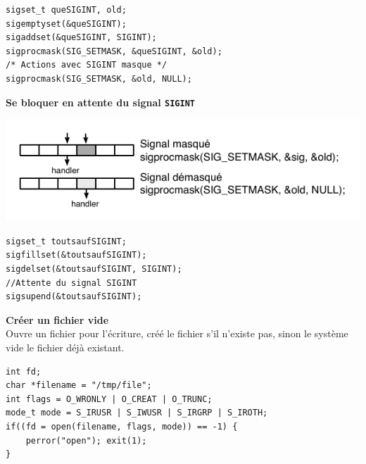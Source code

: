 \documentclass[french]{scrartcl}
\makeatletter
\newenvironment{BlockIndent}{\list{}%
    {\setlength{\leftmargin}{4mm}%
	 \setlength{\listparindent}{\parindent}%
     \setlength{\itemindent}{\listparindent}%
     \setlength{\topsep}{0pt}}%
     \item[]\relax}
{\endlist}
\newenvironment{figurehere}
  {\def\@captype{figure}}
  {}
\makeatother
\begin{document}
\begin{multicols}{3}
\begin{BlockIndent}
\vspace{-5pt}\begin{lstlisting}
sigset_t queSIGINT, old;
sigemptyset(&queSIGINT);
sigaddset(&queSIGINT, SIGINT);
sigprocmask(SIG_SETMASK, &queSIGINT, &old);
/* Actions avec SIGINT masque */
sigprocmask(SIG_SETMASK, &old, NULL);
\end{lstlisting}\vspace{-5pt}
\end{BlockIndent}

\vskip 5pt
\textbf{Se bloquer en attente du signal \lstinline!SIGINT!}

\begin{figurehere}
	\vspace{-5pt}
    \includegraphics[scale=.75]{images/masquer-signal}
	\vspace{-7pt}
\end{figurehere}
\begin{BlockIndent}
\vspace{-5pt}\begin{lstlisting}
sigset_t toutsaufSIGINT;
sigfillset(&toutsaufSIGINT);
sigdelset(&toutsaufSIGINT, SIGINT);
//Attente du signal SIGINT
sigsupend(&toutsaufSIGINT);
\end{lstlisting}\vspace{-5pt}
\end{BlockIndent}

\vskip 5pt
\textbf{Créer un fichier vide}\\
Ouvre un fichier pour l'écriture, créé le fichier s'il n'existe pas, sinon le système vide le fichier déjà existant.
\begin{BlockIndent}
\vspace{-5pt}\begin{lstlisting}
int fd;
char *filename = "/tmp/file";
int flags = O_WRONLY | O_CREAT | O_TRUNC;
mode_t mode = S_IRUSR | S_IWUSR | S_IRGRP | S_IROTH;
if((fd = open(filename, flags, mode)) == -1) {
    perror("open"); exit(1);
}
\end{lstlisting}\vspace{-5pt}
\end{BlockIndent}


\end{multicols}
\end{document}
